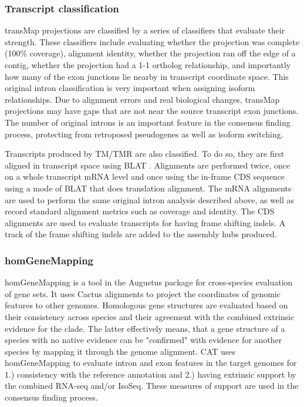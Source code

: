 \documentclass[fleqn,10pt]{wlscirep}
\begin{document}
\subsubsection*{Transcript classification}
	transMap projections are classified by a series of classifiers that evaluate their strength. These classifiers include evaluating whether the projection was complete (100\% coverage), alignment identity, whether the projection ran off the edge of a contig, whether the projection had a 1-1 ortholog relationship, and importantly how many of the exon junctions lie nearby in transcript coordinate space. This original intron classification is very important when assigning isoform relationships. Due to alignment errors and real biological changes, transMap projections may have gaps that are not near the source transcript exon junctions. The number of original introns is an important feature in the consensus finding process, protecting from retroposed pseudogenes as well as isoform switching.
    
	Transcripts produced by TM/TMR are also classified. To do so, they are first aligned in transcript space using BLAT \cite{kent2002blat}. Alignments are performed twice, once on a whole transcript mRNA level and once using the in-frame CDS sequence using a mode of BLAT that does translation alignment. The mRNA alignments are used to perform the same original intron analysis described above, as well as record standard alignment metrics such as coverage and identity. The CDS alignments are used to evaluate transcripts for having frame shifting indels. A track of the frame shifting indels are added to the assembly hubs produced.

\subsubsection*{homGeneMapping}
	homGeneMapping is a tool in the Augustus package for cross-species evaluation of gene sets. It uses Cactus alignments to project the coordinates of genomic features to other genomes. Homologous gene structures are evaluated based on their consistency across species and their agreement with the combined extrinsic evidence for the clade. The latter effectively means, that a gene structure of a species with no native evidence can be "confirmed" with evidence for another species by mapping it through the genome alignment. CAT uses homGeneMapping to evaluate intron and exon features in the target genomes for 1.) consistency with the reference annotation and 2.) having extrinsic support by the combined RNA-seq and/or IsoSeq. These measures of support are used in the consensus finding process.
\end{document}
